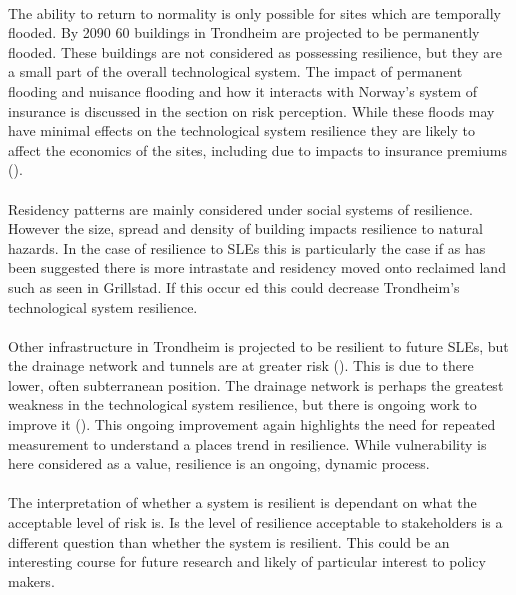 \paragraph{}
The ability to return to normality is only possible for sites which are temporally flooded. By 2090 60 buildings in Trondheim are projected to be permanently flooded. These buildings are not considered as possessing resilience, but they are a small part of the overall technological system. The impact of permanent flooding and nuisance flooding and how it interacts with Norway's system of insurance is discussed in the section on risk perception. While these floods may have minimal effects on the technological system resilience they are likely to affect the economics of the sites, including due to impacts to insurance premiums (\cite{cutter_community_2020}). 
\paragraph{}
Residency patterns are mainly considered under social systems of resilience. However the size, spread and density of building impacts resilience to natural hazards. In the case of resilience to SLEs this is particularly the case if as has been suggested there is more intrastate and residency moved onto reclaimed land such as seen in Grillstad. If this occur ed this could decrease Trondheim's technological system resilience.
\paragraph{}
Other infrastructure in Trondheim is projected to be resilient to future SLEs, but the drainage network and tunnels are at greater risk (\cite{hanssen_saksframlegg_2013}). This is due to there lower, often subterranean position. The drainage network is perhaps the greatest weakness in the technological system resilience, but there is ongoing work to improve it (\cite{hanssen_saksframlegg_2013}). This ongoing improvement again highlights the need for repeated measurement to understand a places trend in resilience. While vulnerability is here considered as a value, resilience is an ongoing, dynamic process.
\paragraph{}
The interpretation of whether a system is resilient is dependant on what the acceptable level of risk is. Is the level of resilience acceptable to stakeholders is a different question than whether the system is resilient. This could be an interesting course for future research and likely of particular interest to policy makers.
